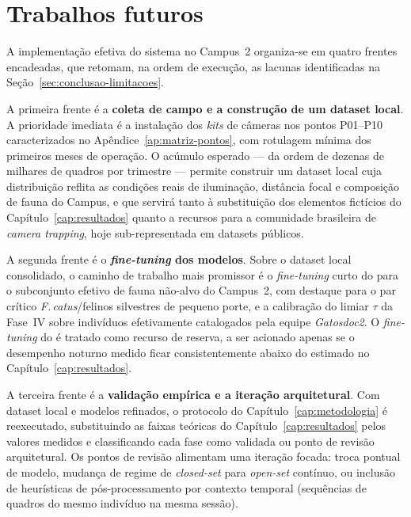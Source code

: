 \section{Trabalhos futuros}
\label{sec:conclusao-futuros}

A implementação efetiva do sistema no Campus~2 organiza-se em quatro frentes encadeadas, que retomam, na ordem de execução, as lacunas identificadas na Seção~\ref{sec:conclusao-limitacoes}.

A primeira frente é a \textbf{coleta de campo e a construção de um dataset local}. A prioridade imediata é a instalação dos \emph{kits} de câmeras nos pontos P01--P10 caracterizados no Apêndice~\ref{ap:matriz-pontos}, com rotulagem mínima dos primeiros meses de operação. O acúmulo esperado --- da ordem de dezenas de milhares de quadros por trimestre --- permite construir um dataset local cuja distribuição reflita as condições reais de iluminação, distância focal e composição de fauna do Campus, e que servirá tanto à substituição dos elementos fictícios do Capítulo~\ref{cap:resultados} quanto a recursos para a comunidade brasileira de \emph{camera trapping}, hoje sub-representada em datasets públicos.

A segunda frente é o \textbf{\emph{fine-tuning} dos modelos}. Sobre o dataset local consolidado, o caminho de trabalho mais promissor é o \emph{fine-tuning} curto do \modeloSN{} para o subconjunto efetivo de fauna não-alvo do Campus~2, com destaque para o par crítico \emph{F.\,catus}/felinos silvestres de pequeno porte, e a calibração do limiar $\tau$ da Fase~IV sobre indivíduos efetivamente catalogados pela equipe \emph{Gatosdoc2}. O \emph{fine-tuning} do \modeloMD{} é tratado como recurso de reserva, a ser acionado apenas se o desempenho noturno medido ficar consistentemente abaixo do estimado no Capítulo~\ref{cap:resultados}.

A terceira frente é a \textbf{validação empírica e a iteração arquitetural}. Com dataset local e modelos refinados, o protocolo do Capítulo~\ref{cap:metodologia} é reexecutado, substituindo as faixas teóricas do Capítulo~\ref{cap:resultados} pelos valores medidos e classificando cada fase como validada ou ponto de revisão arquitetural. Os pontos de revisão alimentam uma iteração focada: troca pontual de modelo, mudança de regime de \emph{closed-set} para \emph{open-set} contínuo, ou inclusão de heurísticas de pós-processamento por contexto temporal (sequências de quadros do mesmo indivíduo na mesma sessão).

